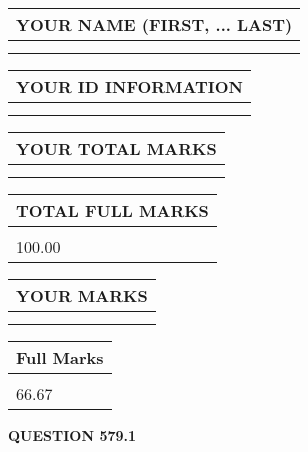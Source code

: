 \documentclass{ctexart}
\begin{document}
   
   
   
\newpage 
\setcounter{page}{ 
   579001 } 
   
   
   
   
\noindent\begin{tabular}{|l|}
\hline
YOUR NAME (FIRST, ... LAST)  \\
\hline
 \\ 
 \\ 
\hline
\end{tabular}
\hspace{0.05in} \begin{tabular}{|l|}
\hline
 YOUR   ID   INFORMATION  \\
\hline
 \\ 
 \\ 
\hline
\end{tabular}
   
   
\vspace{0.2in}\noindent\begin{tabular}{|l|}
\hline
YOUR TOTAL MARKS  \\
\hline
 \\ 
 \\ 
\hline
\end{tabular}
\hspace{0.05in} \begin{tabular}{|l|}
\hline
TOTAL FULL MARKS  \\
\hline
 \\ 
100.00 \\
\hline
\end{tabular}
   
   
 \vspace{0.2in}
 
 
 
 
   
   
  
\vspace{0.2in}
  
\noindent\begin{tabular}{|l|}
\hline
 YOUR MARKS  \\
\hline
 \\ 
 \\ 
\hline
\end{tabular}
\hspace{0.05in} \begin{tabular}{|l|}
\hline
 Full Marks  \\
\hline
 \\ 
66.67 \\
\hline
\end{tabular}
{\textbf{\Large{QUESTION
579.1 
}}}
  
\end{document}
